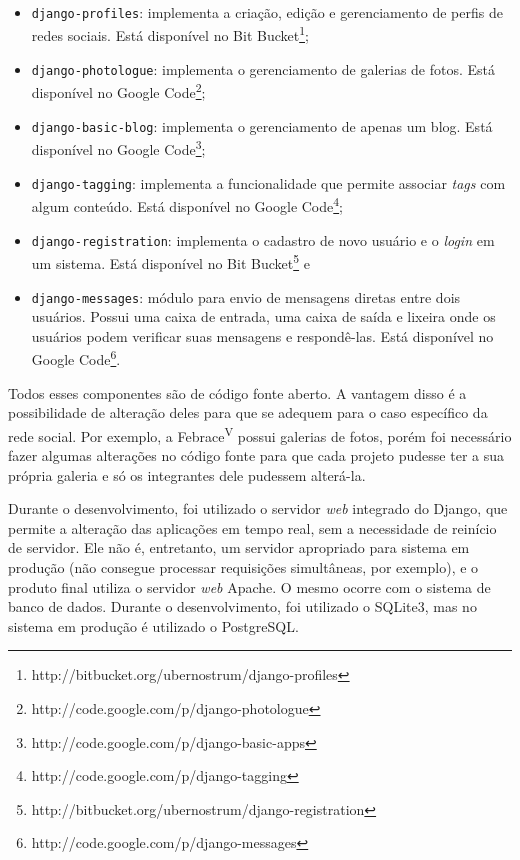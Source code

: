 	\begin{itemize}
	  \item{
		\texttt{django-profiles}: implementa a criação, edição e gerenciamento de perfis de redes sociais. Está disponível no Bit Bucket\footnote{http://bitbucket.org/ubernostrum/django-profiles};
	  }
	  \item{
		\texttt{django-photologue}: implementa o gerenciamento de galerias de fotos. Está disponível no Google Code\footnote{http://code.google.com/p/django-photologue};
	  }
	  \item{ 
	    \texttt{django-basic-blog}: implementa o gerenciamento de apenas um blog. Está disponível no Google Code\footnote{http://code.google.com/p/django-basic-apps};
	  }
	  \item{ 
	    \texttt{django-tagging}: implementa a funcionalidade que permite associar \textit{tags} com algum conteúdo. Está disponível no Google Code\footnote{http://code.google.com/p/django-tagging};
	  }
      \item{
        \texttt{django-registration}: implementa o cadastro de novo usuário e o \textit{login} em um sistema. Está disponível no Bit Bucket\footnote{http://bitbucket.org/ubernostrum/django-registration} e
       }
       \item{
        \texttt{django-messages}: módulo para envio de mensagens diretas entre dois usuários. Possui uma caixa de entrada, uma caixa de saída e lixeira onde os usuários podem verificar suas mensagens e respondê-las. Está disponível no Google Code\footnote{http://code.google.com/p/django-messages}.
       }
	\end{itemize} 

Todos esses componentes são de código fonte aberto. A vantagem disso é a possibilidade de alteração deles para que se adequem para o caso específico da rede social. Por exemplo, a Febrace\textsuperscript{V} possui galerias de fotos, porém foi necessário fazer algumas alterações no código fonte para que cada projeto pudesse ter a sua própria galeria e só os integrantes dele pudessem alterá-la.

Durante o desenvolvimento, foi utilizado o servidor \textit{web} integrado do Django, que permite a alteração das aplicações em tempo real, sem a necessidade de reinício de servidor. Ele não é, entretanto, um servidor apropriado para sistema em produção (não consegue processar requisições simultâneas, por exemplo), e o produto final utiliza o servidor \textit{web} Apache. O mesmo ocorre com o sistema de banco de dados. Durante o desenvolvimento, foi utilizado o SQLite3, mas no sistema em produção é utilizado o PostgreSQL.

